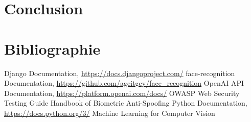 \documentclass[12pt,a4paper]{report}
\begin{document}
\chapter*{Conclusion}

\chapter*{Bibliographie}
\begin{thebibliography}{9}
 Django Documentation, \url{https://docs.djangoproject.com/}
 face-recognition Documentation, \url{https://github.com/ageitgey/face_recognition}
 OpenAI API Documentation, \url{https://platform.openai.com/docs/}
 OWASP Web Security Testing Guide
 Handbook of Biometric Anti-Spoofing
 Python Documentation, \url{https://docs.python.org/3/}
 Machine Learning for Computer Vision
\end{thebibliography}
\end{document}
